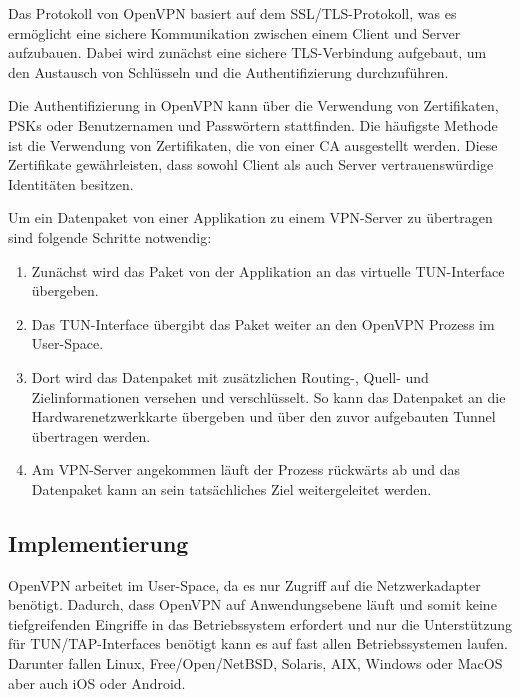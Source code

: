 Das Protokoll von OpenVPN basiert auf dem SSL/TLS-Protokoll, was es ermöglicht eine sichere Kommunikation zwischen einem Client und Server aufzubauen. Dabei wird zunächst eine sichere TLS-Verbindung aufgebaut, um den Austausch von Schlüsseln und die Authentifizierung durchzuführen. 

Die Authentifizierung in OpenVPN kann über die Verwendung von Zertifikaten, \gls{PSKs} oder Benutzernamen und Passwörtern stattfinden. Die häufigste Methode ist die Verwendung von Zertifikaten, die von einer \gls{CA} ausgestellt werden. Diese Zertifikate gewährleisten, dass sowohl Client als auch Server vertrauenswürdige Identitäten besitzen.

Um ein Datenpaket von einer Applikation zu einem \gls{VPN}-Server zu übertragen sind folgende Schritte notwendig:

\begin{enumerate}
    \item Zunächst wird das Paket von der Applikation an das virtuelle TUN-Interface übergeben.
    \item Das TUN-Interface übergibt das Paket weiter an den OpenVPN Prozess im User-Space.
    \item Dort wird das Datenpaket mit zusätzlichen Routing-, Quell- und Zielinformationen versehen und verschlüsselt. So kann das Datenpaket an die Hardwarenetzwerkkarte übergeben und über den zuvor aufgebauten Tunnel übertragen werden.
    \item Am \gls{VPN}-Server angekommen läuft der Prozess rückwärts ab und das Datenpaket kann an sein tatsächliches Ziel weitergeleitet werden.
\end{enumerate}

\subsection{Implementierung}
OpenVPN arbeitet im User-Space, da es nur Zugriff auf die Netzwerkadapter benötigt. Dadurch, dass OpenVPN auf Anwendungsebene läuft und somit keine tiefgreifenden Eingriffe in das Betriebssystem erfordert und nur die Unterstützung für TUN/TAP-Interfaces benötigt kann es auf fast allen Betriebssystemen laufen. Darunter fallen Linux, Free/Open/NetBSD, Solaris, AIX, Windows oder MacOS aber auch iOS oder Android.